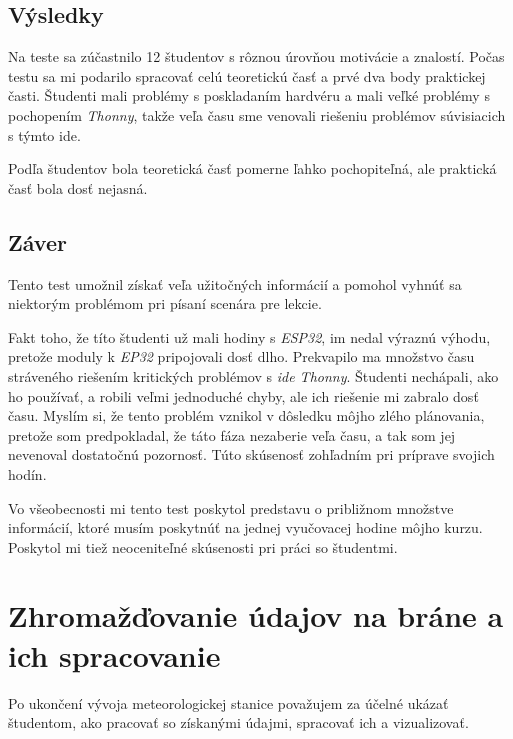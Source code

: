 \subsection{Výsledky}

Na teste sa zúčastnilo 12 študentov s rôznou úrovňou motivácie a znalostí. Počas testu sa mi podarilo spracovať celú teoretickú časť a prvé dva body praktickej časti.  Študenti mali problémy s poskladaním hardvéru a mali veľké problémy s pochopením \textit{Thonny}, takže veľa času sme venovali riešeniu problémov súvisiacich s týmto \gls{ide}.

Podľa študentov bola teoretická časť pomerne ľahko pochopiteľná, ale praktická časť bola dosť nejasná.

\subsection{Záver}

Tento test umožnil získať veľa užitočných informácií a pomohol vyhnúť sa niektorým problémom pri písaní scenára pre lekcie. 

Fakt toho, že títo študenti už mali hodiny s \textit{ESP32}, im nedal výraznú výhodu, pretože moduly k \textit{EP32} pripojovali dosť dlho. Prekvapilo ma množstvo času stráveného riešením kritických problémov s \textit{\gls{ide} Thonny}. Študenti nechápali, ako ho používať, a robili veľmi jednoduché chyby, ale ich riešenie mi zabralo dosť času. Myslím si, že tento problém vznikol v dôsledku môjho zlého plánovania, pretože som predpokladal, že táto fáza nezaberie veľa času, a tak som jej nevenoval dostatočnú pozornosť. Túto skúsenosť zohľadním pri príprave svojich hodín.

Vo všeobecnosti mi tento test poskytol predstavu o približnom množstve informácií, ktoré musím poskytnúť na jednej vyučovacej hodine môjho kurzu. Poskytol mi tiež neoceniteľné skúsenosti pri práci so študentmi.

\section{Zhromažďovanie údajov na bráne a ich spracovanie}

Po ukončení vývoja meteorologickej stanice považujem za účelné ukázať študentom, ako pracovať so získanými údajmi, spracovať ich a vizualizovať. 

